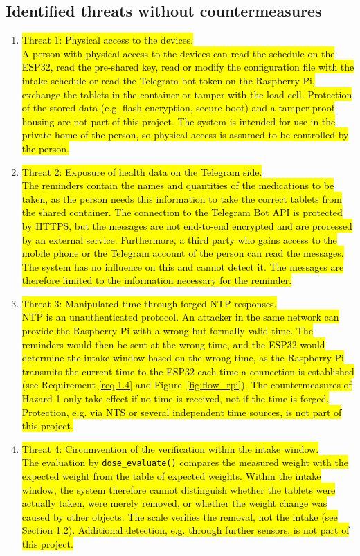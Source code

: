 \subsection{Identified threats without countermeasures}
\begin{enumerate}
  \item \hl{Threat 1: Physical access to the devices.}\\
  \hl{A person with physical access to the devices can read the schedule on
  the ESP32, read the pre-shared key, read or modify the configuration file with the
  intake schedule or read the Telegram bot token on the Raspberry Pi, exchange the tablets
  in the container or tamper with the load cell. Protection of the stored data
  (e.g. flash encryption, secure boot) and a tamper-proof housing are not part of
  this project. The system is intended for use in the private home of the
  person, so physical access is assumed to be controlled by the person.}

  \item \hl{Threat 2: Exposure of health data on the Telegram side.}\\
  \hl{The reminders contain the names and quantities of the medications to be
  taken, as the person needs this information to take the correct tablets from
  the shared container. The connection to the Telegram Bot API is
  protected by HTTPS, but the messages are not end-to-end encrypted and are
  processed by an external service. Furthermore, a third party who gains
  access to the mobile phone or the Telegram account of the person can read the
  messages. The system has no influence on this and cannot detect it. The
  messages are therefore limited to the information necessary for the
  reminder.}

  \item \hl{Threat 3: Manipulated time through forged NTP responses.}\\
  \hl{NTP is an unauthenticated protocol. An attacker in the same network can
  provide the Raspberry Pi with a wrong but formally valid time. The reminders
  would then be sent at the wrong time, and the ESP32 would determine the
  intake window based on the wrong time, as the Raspberry Pi transmits the
  current time to the ESP32 each time a connection is established (see
  Requirement \ref{req.1.4} and Figure~\ref{fig:flow_rpi}). The countermeasures of Hazard 1 only take effect
  if no time is received, not if the time is forged. Protection, e.g. via NTS
  or several independent time sources, is not part of this project.}

  \item \hl{Threat 4: Circumvention of the verification within the intake window.}\\
  \hl{The evaluation by {\texttt{dose\_evaluate()}} compares the measured weight with
  the expected weight from the table of expected weights. Within the intake window, the system therefore cannot
  distinguish whether the tablets were actually taken, were merely removed, or
  whether the weight change was caused by other objects. The scale verifies the
  removal, not the intake (see Section 1.2). Additional detection, e.g. through
  further sensors, is not part of this project.}
\end{enumerate}